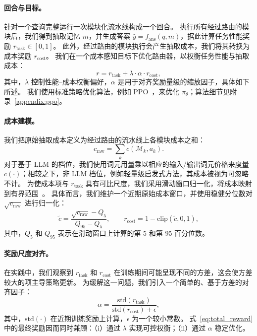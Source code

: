 \paragraph{回合与目标。}
针对一个查询完整运行一次模块化流水线构成一个回合。
执行所有经过路由的模块后，我们得到抽取记忆 $m$，并生成答案 $\hat{y}=f_{\text{ans}}(q,m)$，据此计算任务性能奖励 $r_{\text{task}}\in[0,1]$。
此外，经过路由的模块执行会产生抽取成本，我们将其转换为成本奖励 $r_{\text{cost}}$。
我们在一个成本感知目标下优化路由器，以权衡任务性能与抽取成本：
\begin{equation}
r = r_{\text{task}} + \lambda \cdot \alpha \cdot r_{\text{cost}},
\label{eq:total_reward}
\end{equation}
其中，$\lambda$ 控制性能--成本权衡偏好，$\alpha$ 是用于对齐奖励量级的缩放因子，具体如下所述。
我们使用标准策略优化算法，例如 PPO~\citep{schulman2017proximal}，来优化 $\pi_\theta$；算法细节见附录~\ref{appendix:ppo}。

\paragraph{成本建模。}
我们把原始抽取成本定义为经过路由的流水线上各模块成本之和：
\begin{equation}
c_{\text{raw}} = \sum_{k} c(\mathcal{M}_k, a_k).
\end{equation}
对于基于 LLM 的档位，我们使用词元用量乘以相应的输入/输出词元价格来度量 $c(\cdot)$；相较之下，非 LLM 档位，例如轻量级启发式方法，其成本被视为可忽略不计。
为使成本项与 $r_{\text{task}}$ 具有可比尺度，我们采用滑动窗口归一化，将成本映射到有界范围~\citep{zhang2025router}。
具体而言，我们维护一个近期原始成本窗口，并使用稳健分位数对 $\sqrt{c_{\text{raw}}}$ 进行归一化：
\begin{equation}
\tilde{c} = \frac{\sqrt{c_{\text{raw}}} - Q_{5}}{Q_{95} - Q_{5}},
\qquad
r_{\text{cost}} = 1 - \mathrm{clip}(\tilde{c}, 0, 1),
\label{eq:cost_norm}
\end{equation}
其中，$Q_{5}$ 和 $Q_{95}$ 表示在滑动窗口上计算的第 5 和第 95 百分位数。

\paragraph{奖励尺度对齐。}
在实践中，我们观察到 $r_{\text{task}}$ 和 $r_{\text{cost}}$ 在训练期间可能呈现不同的方差，这会使方差较大的项主导策略更新。
为缓解这一问题，我们引入一个简单的、基于方差的对齐因子：
\begin{equation}
\alpha = \frac{\mathrm{std}(r_{\text{task}})}{\mathrm{std}(r_{\text{cost}}) + \epsilon},
\label{eq:std_align}
\end{equation}
其中，$\mathrm{std}(\cdot)$ 在近期训练奖励上计算，$\epsilon$ 为一个较小常数。
式~\ref{eq:total_reward} 中的最终奖励因而同时兼顾：（i）通过 $\lambda$ 实现可控权衡；（ii）通过 $\alpha$ 稳定优化。
